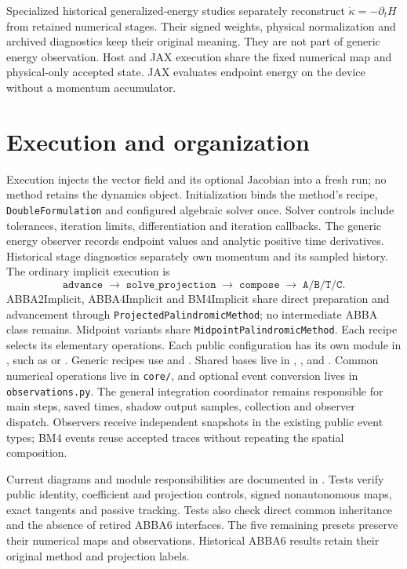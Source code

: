 \documentclass[11pt,a4paper]{article}
\begin{document}
Specialized historical generalized-energy studies separately reconstruct
$\dot\kappa=-\partial_tH$ from retained numerical stages. Their signed weights,
physical normalization and archived diagnostics keep their original meaning.
They are not part of generic energy observation. Host and JAX execution share
the fixed numerical map and physical-only accepted state. JAX evaluates endpoint
energy on the device without a momentum accumulator.

\section{Execution and organization}
Execution injects the vector field and its optional Jacobian into a fresh run;
no method retains the dynamics object. Initialization binds the method's recipe,
\texttt{DoubleFormulation} and configured algebraic solver once. Solver controls
include tolerances, iteration limits, differentiation and iteration callbacks.
The generic energy observer records endpoint values and analytic positive time derivatives. Historical stage diagnostics separately own momentum and its sampled history. The
ordinary implicit execution is
\[
 \texttt{advance}\;\longrightarrow\;\texttt{solve\_projection}
 \;\longrightarrow\;\texttt{compose}
 \;\longrightarrow\;\texttt{A/B/T/C}.
\]
ABBA2Implicit, ABBA4Implicit and BM4Implicit share direct preparation and
advancement through \texttt{ProjectedPalindromicMethod}; no intermediate ABBA
class remains. Midpoint variants share \texttt{MidpointPalindromicMethod}.
Each recipe selects its elementary operations.
Each public configuration has its own module in
, such as  or
. Generic recipes use  and
. Shared bases live in ,
, and . Common
numerical operations live in \texttt{core/}, and optional event conversion
lives in \texttt{observations.py}. The general
integration coordinator remains responsible for main steps, saved times,
shadow output samples, collection and observer dispatch. Observers receive
independent snapshots in the existing public event types; BM4 events reuse
accepted traces without repeating the spatial composition.

Current diagrams and module responsibilities are documented in
.
Tests verify public identity, coefficient and projection controls, signed
nonautonomous maps, exact tangents and passive tracking. Tests also check
direct common inheritance and the absence of retired ABBA6 interfaces.
The five remaining presets preserve their numerical maps and observations.
Historical ABBA6 results retain their original method and projection labels.
\end{document}
